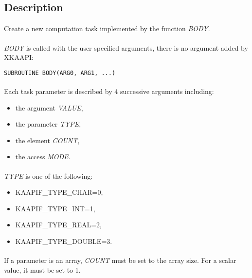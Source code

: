 \documentclass[a4paper, 11pt]{article}
\begin{document}
\subsection{Description}
\paragraph{}
Create a new computation task implemented by the function \textit{BODY}.

\paragraph{}
\textit{BODY} is called with the user specified arguments, there is no
argument added by XKAAPI:\\
\begin{small}
\lstset{language=C}
\begin{lstlisting}[frame=tb]
SUBROUTINE BODY(ARG0, ARG1, ...)
\end{lstlisting}
\end{small}

\paragraph{}
Each task parameter is described by 4 successive arguments including:
\begin{itemize}
\item the argument \textit{VALUE},
\item the parameter \textit{TYPE},
\item the element \textit{COUNT},
\item the access \textit{MODE}.
\end{itemize}

\paragraph{}
\textit{TYPE} is one of the following:
\begin{itemize}
\item KAAPIF\_TYPE\_CHAR=0,
\item KAAPIF\_TYPE\_INT=1,
\item KAAPIF\_TYPE\_REAL=2,
\item KAAPIF\_TYPE\_DOUBLE=3.
\end{itemize}

\paragraph{}
If a parameter is an array, \textit{COUNT} must be set to the array size.
For a scalar value, it must be set to 1.
\end{document}
